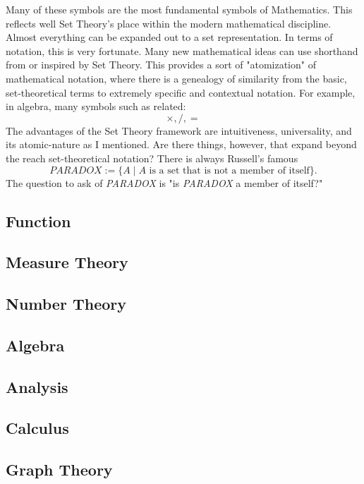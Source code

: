 \documentclass{article}
\begin{document}
	Many of these symbols are the most fundamental symbols of Mathematics. This reflects well Set Theory's place within the modern mathematical discipline. Almost everything can be expanded out to a set representation. In terms of notation, this is very fortunate. Many new mathematical ideas can use shorthand from or inspired by Set Theory. This provides a sort of "atomization" of mathematical notation, where there is a genealogy of similarity from the basic, set-theoretical terms to extremely specific and contextual notation. For example, in algebra, many symbols such as related:
	\[
		\times, /, =
	\]
	The advantages of the Set Theory framework are intuitiveness, universality, and its atomic-nature as I mentioned. Are there things, however, that expand beyond the reach set-theoretical notation? There is always Russell's famous 
	\[
		\textit{PARADOX} := \{ A \mid A \text{ is a set that is not a member of itself} \}.
	\]
	The question to ask of \textit{PARADOX} is "is \textit{PARADOX} a member of itself?"
	
	
	
	
	
	
\subsection{Function}

\subsection{Measure Theory}

\subsection{Number Theory}

\subsection{Algebra}

\subsection{Analysis}

\subsection{Calculus}

\subsection{Graph Theory}
\end{document}
